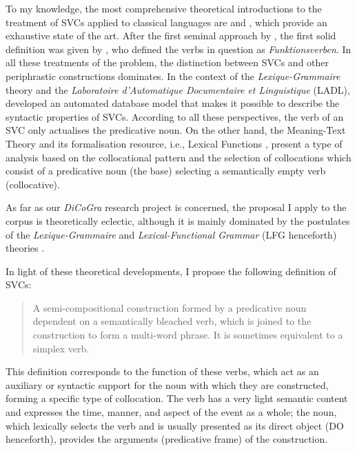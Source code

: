 \documentclass[output=paper,colorlinks,citecolor=brown]{langscibook}
\begin{document}
To my knowledge, the most comprehensive theoretical introductions to the treatment of SVCs
applied to classical languages are \citet{Banos-2022595} and
\citet{PompeiAnnaandMereuLunellaandPiunnoValentina-2023608}, which provide an exhaustive
state of the art. After the first seminal approach by \citet{JespersenOtto-1942107}, the
first solid definition was given by \citet{PolenzvonPeter-1963634}, who defined the
verbs in question as \emph{Funktionsverben}. In all these treatments of the problem, the distinction
between SVCs and other periphrastic constructions dominates. In the context of the
\emph{Lexique-Grammaire} theory and the \emph{Laboratoire d'Automatique Documentaire et
  Linguistique} (LADL),
\citet{GrossGaston-1989673,GrossGaston-1996727,GrossGaston-2004226} developed an automated
database model that makes it possible to describe the syntactic properties of SVCs.
According to all these perspectives, the verb of an SVC only actualises the predicative
noun. On the other hand, the Meaning-Text Theory and its formalisation resource, i.e.,\largerpage
Lexical Functions \parencites{MelcukIgor-2004540,AlonsoRamosMargarita-2004672}, present a
type of analysis based on the collocational pattern and the selection of collocations
which consist of a predicative noun (the base) selecting a semantically empty verb
(collocative).

As far as our \emph{DiCoGra} research project is concerned, the proposal I apply to the
corpus is theoretically eclectic, although it is mainly dominated by the postulates of the
\emph{Lexique-Grammaire} and \textit{Lexical-Functional Grammar} (LFG henceforth) theories \parencite{Banos-2022595}.

In light of these theoretical developments, I propose the following definition of
SVCs:

\begin{quote}
A semi-compositional construction formed by a predicative noun dependent
on a semantically bleached verb, which is joined to the construction to
form a multi-word phrase. It is sometimes equivalent to a simplex verb.
\end{quote}

This definition corresponds to the function of these verbs, which act as an auxiliary or
syntactic support for the noun with which they are constructed, forming a specific type of
collocation. The verb has a very light semantic content and expresses the time, manner,
and aspect of the event as a whole; the noun, which lexically selects the verb and is
usually presented as its direct object (DO henceforth), provides the arguments
(predicative frame) of the construction.
\end{document}
